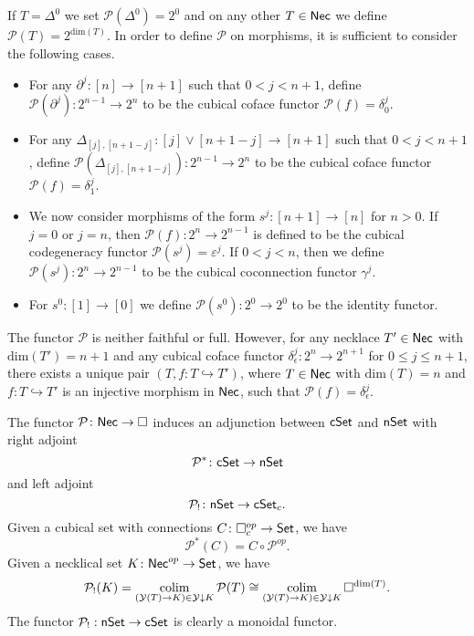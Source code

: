 If $T= \Delta^0$ we set $\mathcal{P}(\Delta^0)=2^0$ and on any other $T \in \mathsf{Nec}$ we define $\mathcal{P}( T )= 2^{\text{dim}(T)}$. In order to define $\mathcal{P}$ on morphisms, it is sufficient to consider the following cases.
\begin{itemize}
\item For any $\partial^j \colon [n] \to [n+1]$ such that $0< j<{n+1}$, define $\mathcal{P}(\partial^j) \colon 2^{n-1}\to 2^{n}$ to be the cubical coface functor $\mathcal{P}(f)= \delta_0^{j}.$ 

\item For any $\Delta_{[j], [n+1-j]} \colon [j] \vee [n+1-j] \to [n+1]$ such that $0<j<n+1$, define $\mathcal{P}(\Delta_{[j], [n+1-j]}) \colon 2^{n-1}\to 2^{n}$ to be the cubical coface functor $\mathcal{P}(f)=\delta_1^{j}$.

\item We now consider morphisms of the form $s^j \colon [n+1] \to [n]$ for $n>0$. If $j=0$ or $j=n$, then $\mathcal{P}(f) \colon 2^n \to 2^{n-1}$ is defined to be the cubical codegeneracy functor $\mathcal{P}(s^j)= \varepsilon^{j}.$ If $0<j<n$, then we define $\mathcal{P}(s^j) \colon 2^n \to 2^{n-1}$ to be the cubical coconnection functor $\gamma^{j}.$

\item For $s^0 \colon [1] \to [0]$ we define $\mathcal{P}(s^0) \colon 2^0 \to 2^0$ to be the identity functor.

\end{itemize}
\begin{remark}
The functor $\mathcal{P}$ is neither faithful or full. However, for any necklace $T' \in \mathsf{Nec}$ with $\text{dim}(T')=n+1$ and any cubical coface functor $\delta_{\epsilon}^j \colon 2^n \to 2^{n+1}$ for $0 \leq j \leq n+1$, there exists a unique pair $(T, f \colon T \hookrightarrow T')$, where $T \in \mathsf{Nec}$ with $\text{dim}(T)=n$ and $f \colon T \hookrightarrow T'$ is an injective morphism in $\mathsf{Nec}$, such that $\mathcal{P}(f)=\delta_{\epsilon}^j $.
\end{remark}

The functor $\mathcal{P} \colon \mathsf{Nec} \to \square$ induces an adjunction between $\mathsf{cSet}$ and $\mathsf{nSet}$
with right adjoint
$$\mathcal{P}^* \colon \mathsf{cSet} \to \mathsf{nSet}$$
and left adjoint
$$\mathcal{P}_{!}  \colon \mathsf{nSet} \to \mathsf{cSet}_c.$$
Given a cubical set with connections $C \colon \square_c^{op} \to \mathsf{Set}$, we have $$\mathcal{P}^*(C)= C \circ \mathcal{P}^{op}.$$ Given a necklical set $K \colon \mathsf{Nec}^{op} \to \mathsf{Set}$, we have $$\mathcal{P}_{!}(K)= \operatorname*{colim}_{(\mathcal{Y}(T) \to K) \in \mathcal{Y} \downarrow K} \mathcal{P}(T) \cong \operatorname*{colim}_{(\mathcal{Y}(T) \to K) \in \mathcal{Y} \downarrow K} \square^{\text{dim}(T)}.$$ 
The functor $\mathcal{P}_{!}: \mathsf{nSet} \to \mathsf{cSet}$ is clearly a monoidal functor. 



